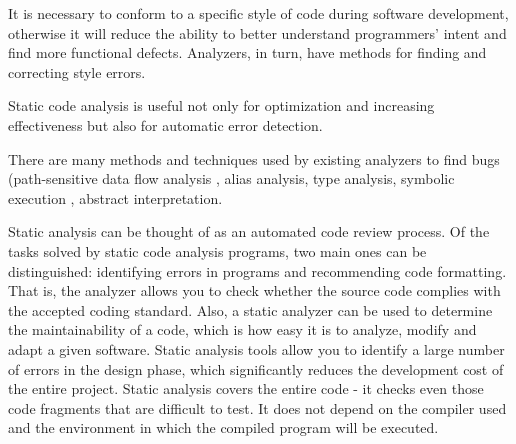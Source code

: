 It is necessary to conform to a specific style of code during software development, otherwise it will reduce the ability to better understand programmers’ intent and ﬁnd more functional defects. Analyzers, in turn, have methods for finding and correcting style errors. 

Static code analysis is useful not only for optimization and increasing effectiveness but also for automatic error detection.

There are many methods and techniques used by existing analyzers to ﬁnd bugs (path-sensitive data ﬂow analysis \cite{ref:kremenek}, alias analysis\cite{ref:effective}, type analysis\cite{ref:simple}, symbolic execution \cite{ref:dis}, abstract interpretation\cite{ref:dis}.

Static analysis can be thought of as an automated code review process. Of the tasks solved by static code analysis programs, two main ones can be distinguished: identifying errors in programs and recommending code formatting. That is, the analyzer allows you to check whether the source code complies with the accepted coding standard. Also, a static analyzer can be used to determine the maintainability of a code, which is how easy it is to analyze, modify and adapt a given software. Static analysis tools allow you to identify a large number of errors in the design phase, which significantly reduces the development cost of the entire project. Static analysis covers the entire code - it checks even those code fragments that are difficult to test. It does not depend on the compiler used and the environment in which the compiled program will be executed.